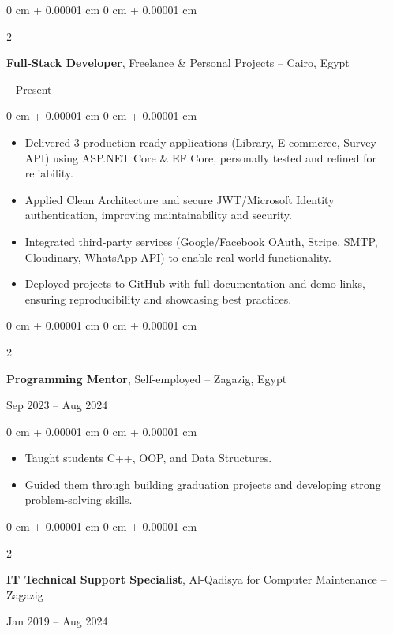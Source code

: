 \documentclass[10pt, letterpaper]{article}
\newenvironment{highlights}{
    \begin{itemize}[
        topsep=0.10 cm,
        parsep=0.10 cm,
        partopsep=0pt,
        itemsep=0pt,
        leftmargin=0 cm + 10pt
    ]
}{
    \end{itemize}
} %
\newenvironment{onecolentry}{
    \begin{adjustwidth}{
        0 cm + 0.00001 cm
    }{
        0 cm + 0.00001 cm
    }
}{
    \end{adjustwidth}
} %
\newenvironment{twocolentry}[2][]{
    \onecolentry
    \def\secondColumn{#2}
    \setcolumnwidth{\fill, 4.5 cm}
    \begin{paracol}{2}
}{
    \switchcolumn \raggedleft \secondColumn
    \end{paracol}
    \endonecolentry
} %
\begin{document}
    \begin{twocolentry}{2024 -- Present}
        \textbf{Full-Stack Developer}, Freelance \& Personal Projects -- Cairo, Egypt
    \end{twocolentry}
    
    \vspace{0.10 cm}
    \begin{onecolentry}
        \begin{highlights}
            \item Delivered 3 production-ready applications (Library, E-commerce, Survey API) using ASP.NET Core \& EF Core, personally tested and refined for reliability.
            \item Applied Clean Architecture and secure JWT/Microsoft Identity authentication, improving maintainability and security.
            \item Integrated third-party services (Google/Facebook OAuth, Stripe, SMTP, Cloudinary, WhatsApp API) to enable real-world functionality.
            \item Deployed projects to GitHub with full documentation and demo links, ensuring reproducibility and showcasing best practices.
        \end{highlights}
    \end{onecolentry}
    
    \vspace{0.2 cm}
    
    \begin{twocolentry}{Sep 2023 -- Aug 2024}
        \textbf{Programming Mentor}, Self-employed -- Zagazig, Egypt
    \end{twocolentry}
    
    \vspace{0.10 cm}
    \begin{onecolentry}
        \begin{highlights}
            \item Taught students C++, OOP, and Data Structures.
            \item Guided them through building graduation projects and developing strong problem-solving skills.
        \end{highlights}
    \end{onecolentry}
    
    \vspace{0.2 cm}
    
    \begin{twocolentry}{Jan 2019 -- Aug 2024}
        \textbf{IT Technical Support Specialist}, Al-Qadisya for Computer Maintenance -- Zagazig
    \end{twocolentry}
    
\end{document}
